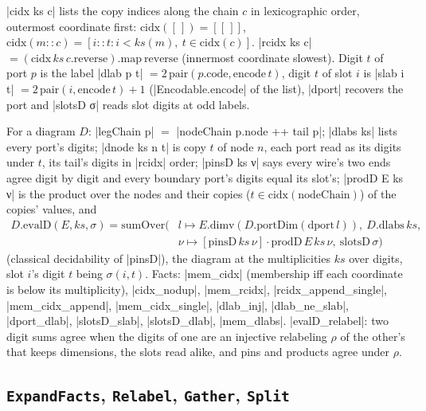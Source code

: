 \begin{definition}
\lean|cidx ks c| lists the copy indices along the chain $c$ in lexicographic order, outermost
coordinate first: $\mathrm{cidx}([\,])=[[\,]]$, $\mathrm{cidx}(m{::}c)=[i{::}t: i<ks(m),\ t\in\mathrm{cidx}(c)]$.
\lean|rcidx ks c| $=(\mathrm{cidx}\,ks\,c.\mathrm{reverse}).\mathrm{map\ reverse}$ (innermost coordinate slowest).
Digit $t$ of port $p$ is the label \lean|dlab p t| $=2\,\mathrm{pair}(p.\mathrm{code},\mathrm{encode}\,t)$, digit $t$ of
slot $i$ is \lean|slab i t| $=2\,\mathrm{pair}(i,\mathrm{encode}\,t)+1$ (\lean|Encodable.encode| of the list),
\lean|dport| recovers the port and \lean|slotsD σ| reads slot digits at odd labels.
\end{definition}
For a diagram $D$: \lean|legChain p| $=$ \lean|nodeChain p.node ++ tail p|; \lean|dlabs ks| lists every
port's digits; \lean|dnode ks n t| is copy $t$ of node $n$, each port read as its digits under $t$,
its tail's digits in \lean|rcidx| order; \leanLLone|pinsD ks ν| says every wire's two ends agree digit by
digit and every boundary port's digits equal its slot's; \leanLLone|prodD E ks ν| is the product over the
nodes and their copies ($t\in\mathrm{cidx}(\mathrm{nodeChain})$) of the copies' values, and
\[\begin{aligned}
 D.\mathrm{evalD}(E,ks,\sigma)=\mathrm{sumOver}\bigl(&l\mapsto E.\mathrm{dimv}(D.\mathrm{portDim}(\mathrm{dport}\,l)),\
 D.\mathrm{dlabs}\,ks,\\
 &\nu\mapsto[\mathrm{pinsD}\,ks\,\nu]\cdot\mathrm{prodD}\,E\,ks\,\nu,\ \mathrm{slotsD}\,\sigma\bigr)
\end{aligned}\]
(classical decidability of \lean|pinsD|), the diagram at the multiplicities $ks$ over digits, slot
$i$'s digit $t$ being $\sigma(i,t)$. Facts: \lean|mem_cidx| (membership iff each coordinate is below
its multiplicity), \lean|cidx_nodup|, \lean|mem_rcidx|, \lean|rcidx_append_single|,
\lean|mem_cidx_append|, \lean|mem_cidx_single|, \lean|dlab_inj|, \lean|dlab_ne_slab|,
\lean|dport_dlab|, \lean|slotsD_slab|, \lean|slotsD_dlab|, \lean|mem_dlabs|. \lean|evalD_relabel|:
two digit sums agree when the digits of one are an injective relabeling $\rho$ of the other's that
keeps dimensions, the slots read alike, and pins and products agree under $\rho$.

\subsection{\texttt{ExpandFacts}, \texttt{Relabel}, \texttt{Gather}, \texttt{Split}}

